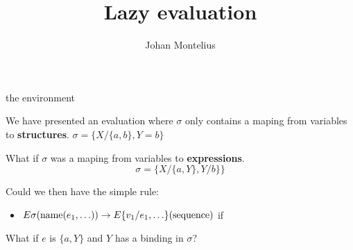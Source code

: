


\title[ID1019 Lazy evaluation]{Lazy evaluation}


\author{Johan Montelius}
\date{\semester}



\begin{frame}
\titlepage
\end{frame}


\begin{frame}{the environment}

\pause We have presented an evaluation where $\sigma$ only contains a maping from variables to {\bf structures}. $\sigma = \lbrace X/\lbrace a, b\rbrace, Y = b\rbrace$

\pause What if $\sigma$ was a maping from variables to {\bf expressions}. $$\sigma = \lbrace X/\lbrace a, Y\rbrace, Y/b \rbrace\rbrace$$

\pause Could we then have the simple rule:

  \begin{itemize} 
   \pause\item $E\sigma({\rm name}(e_1, \ldots)) \rightarrow E\{v_1/e_1, \ldots\}({\rm sequence} )$ if
  \end{itemize}

\pause What if $e$ is $\lbrace a, Y\rbrace$ and $Y$ has a binding in $\sigma$?


\end{frame}

